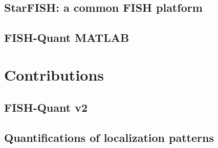 ~\cite{khater_caveolae_2019}

\subsection{StarFISH: a common \ac{FISH} platform}

\subsection{FISH-Quant MATLAB}

\section{Contributions}
\label{sec:contributions}

\subsection{FISH-Quant v2}

\subsection{Quantifications of localization patterns}
